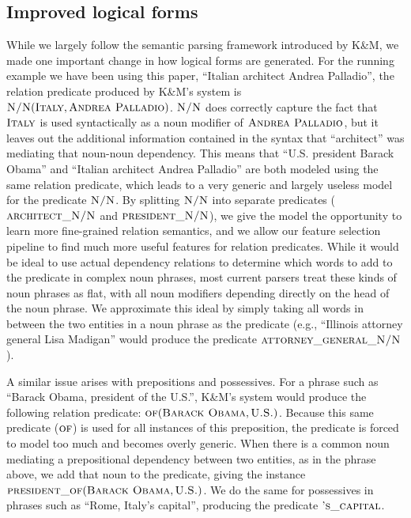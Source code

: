 \documentclass[11pt]{article}
\newcommand{\predicate}[1]{\ensuremath{\textsc{#1}}}
\newcommand{\entity}[1]{\ensuremath{\textsc{#1}}}
\begin{document}
\subsection{Improved logical forms}
\label{sec:better-lfs}

While we largely follow the semantic parsing framework introduced by K\&M, we
made one important change in how logical forms are generated.  For the running
example we have been using this paper, ``Italian architect Andrea Palladio'',
the relation predicate produced by K\&M's system is
$\predicate{N/N}(\entity{Italy}, \entity{Andrea Palladio})$.  \predicate{N/N}
does correctly capture the fact that \entity{Italy} is used syntactically as a
noun modifier of \entity{Andrea Palladio}, but it leaves out the additional
information contained in the syntax that ``architect'' was mediating that
noun-noun dependency.  This means that ``U.S. president Barack Obama'' and
``Italian architect Andrea Palladio'' are both modeled using the same relation
predicate, which leads to a very generic and largely useless model for the
predicate \predicate{N/N}.  By splitting \predicate{N/N} into separate
predicates (\predicate{architect\_N/N} and \predicate{president\_N/N}), we give
the model the opportunity to learn more fine-grained relation semantics, and we
allow our feature selection pipeline to find much more useful features for
relation predicates.  While it would be ideal to use actual dependency
relations to determine which words to add to the predicate in complex noun
phrases, most current parsers treat these kinds of noun phrases as flat, with
all noun modifiers depending directly on the head of the noun phrase.  We
approximate this ideal by simply taking all words in between the two entities
in a noun phrase as the predicate (e.g., ``Illinois attorney general Lisa
Madigan'' would produce the predicate \predicate{attorney\_general\_N/N}).

A similar issue arises with prepositions and possessives.  For a phrase such as
``Barack Obama, president of the U.S.'', K\&M's system would produce the
following relation predicate: $\predicate{of}(\entity{Barack Obama},
\entity{U.S.})$.  Because this same predicate (\predicate{of}) is used for all
instances of this preposition, the predicate is forced to model too much and
becomes overly generic.  When there is a common noun mediating a prepositional
dependency between two entities, as in the phrase above, we add that noun to
the predicate, giving the instance $\predicate{president\_of}(\entity{Barack
Obama}, \entity{U.S.})$.  We do the same for possessives in phrases such as
``Rome, Italy's capital'', producing the predicate \predicate{'s\_capital}.
\end{document}
